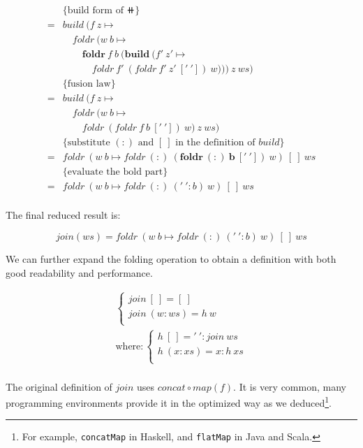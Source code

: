 \documentclass[b5paper]{article}
\begin{document}
\begin{example}
\[\begin{array}{rl}
  & \{\text{build form of } \doubleplus \} \\
= & build\ (f\ z \mapsto \\
  & \quad foldr\ (w\ b \mapsto \\
  & \quad \quad \pmb{foldr}\ f\ b\ (\pmb{build}\ (f'\ z' \mapsto \\
  & \quad \quad \quad foldr\ f'\ (foldr\ f'\ z'\ ['\ '])\ w)))\ z\ ws) \\

  & \{\text{fusion law}\} \\
= & build\ (f\ z \mapsto \\
  & \quad foldr\ (w\ b \mapsto \\
  & \quad \quad foldr\ (foldr\ f\ b\ ['\ '])\ w)\ z\ ws) \\

  & \{\text{substitute $(:)$ and $[\ ]$ in the definition of $build$}\} \\
= & foldr\ (w\ b \mapsto foldr\ (:)\ \pmb{(foldr\ (:)\ b\ ['\ '])}\ w)\ [\ ]\ ws \\

  & \{\text{evaluate the bold part}\} \\
= & foldr\ (w\ b \mapsto foldr\ (:)\ ('\ ' : b)\ w)\ [\ ]\ ws \\
\end{array} \]

The final reduced result is:

\[
join(ws) = foldr\ (w\ b \mapsto foldr\ (:)\ ('\ ' : b)\ w)\ [\ ]\ ws
\]

We can further expand the folding operation to obtain a definition with both good readability and performance.

\[
\begin{array}{l}
\begin{cases}
join\ [\ ] = [\ ] \\
join\ (w:ws) = h\ w \\
\end{cases} \\
\text{where}: \begin{cases}
             h\ [\ ] = '\ ' : join\ ws \\
             h\ (x:xs) = x : h\ xs \\
             \end{cases} \\
\end{array}
\]

 
The original definition of $join$ uses $concat \circ map(f)$. It is very common, many programming environments provide it in the optimized way as we deduced\footnote{For example, \texttt{concatMap} in Haskell, and \texttt{flatMap} in Java and Scala.}.
\end{example}
\end{document}
